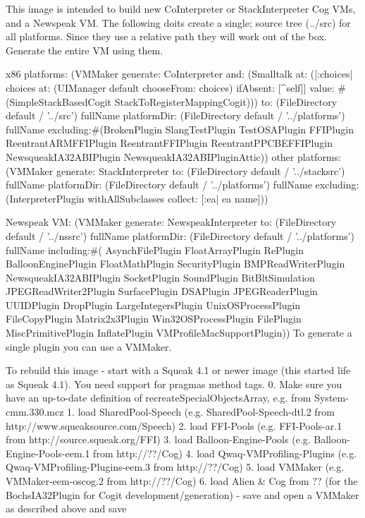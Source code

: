 \documentclass[a4paper,10pt,twoside]{book}
\begin{document}
\begin{code}{}
This image is intended to build new CoInterpreter or StackInterpreter Cog VMs, and a Newspeak VM.
The following doits create a single; source tree (../src) for all platforms.  Since they use a relative path they will work out of the box.  Generate the entire VM using them.

x86 platforms:
	(VMMaker
		generate: CoInterpreter
		and: (Smalltalk
				at: ([:choices| choices at: (UIManager default chooseFrom: choices)
				ifAbsent: [^self]]
					value: #(SimpleStackBasedCogit StackToRegisterMappingCogit)))
		to: (FileDirectory default / '../src') fullName
		platformDir: (FileDirectory default / '../platforms') fullName
		excluding:#(BrokenPlugin SlangTestPlugin TestOSAPlugin
					FFIPlugin ReentrantARMFFIPlugin ReentrantFFIPlugin ReentrantPPCBEFFIPlugin
					NewsqueakIA32ABIPlugin NewsqueakIA32ABIPluginAttic))
other platforms:
	 (VMMaker
		generate: StackInterpreter
		to: (FileDirectory default / '../stacksrc') fullName
		platformDir: (FileDirectory default / '../platforms') fullName
		excluding: (InterpreterPlugin withAllSubclasses collect: [:ea| ea name]))

Newspeak VM:
	(VMMaker
		generate: NewspeakInterpreter
		to: (FileDirectory default / '../nssrc') fullName
		platformDir: (FileDirectory default / '../platforms') fullName
		including:#(	AsynchFilePlugin FloatArrayPlugin RePlugin BalloonEnginePlugin FloatMathPlugin
					SecurityPlugin BMPReadWriterPlugin NewsqueakIA32ABIPlugin SocketPlugin
					SoundPlugin BitBltSimulation JPEGReadWriter2Plugin SurfacePlugin DSAPlugin
					JPEGReaderPlugin UUIDPlugin DropPlugin LargeIntegersPlugin UnixOSProcessPlugin
					FileCopyPlugin Matrix2x3Plugin Win32OSProcessPlugin FilePlugin
					MiscPrimitivePlugin InflatePlugin VMProfileMacSupportPlugin))
To generate a single plugin you can use a VMMaker.

To rebuild this image
- start with a Squeak 4.1 or newer image (this started life as Squeak 4.1).  You need support for pragmas method tags.
0. Make sure you have an up-to-date definition of recreateSpecialObjectsArray, e.g. from System-cmm.330.mcz
1. load SharedPool-Speech (e.g. SharedPool-Speech-dtl.2 from http://www.squeaksource.com/Speech)
2. load FFI-Pools (e.g. FFI-Pools-ar.1 from http://source.squeak.org/FFI)
3. load Balloon-Engine-Pools (e.g. Balloon-Engine-Pools-eem.1 from http://??/Cog)
4. load  Qwaq-VMProfiling-Plugins (e.g.  Qwaq-VMProfiling-Plugins-eem.3 from http://??/Cog)
5. load VMMaker (e.g. VMMaker-eem-oscog.2 from http://??/Cog)
6. load Alien & Cog from ?? (for the BochsIA32Plugin for Cogit development/generation)
- save and open a VMMaker as described above and save
\end{code}
\end{document}
